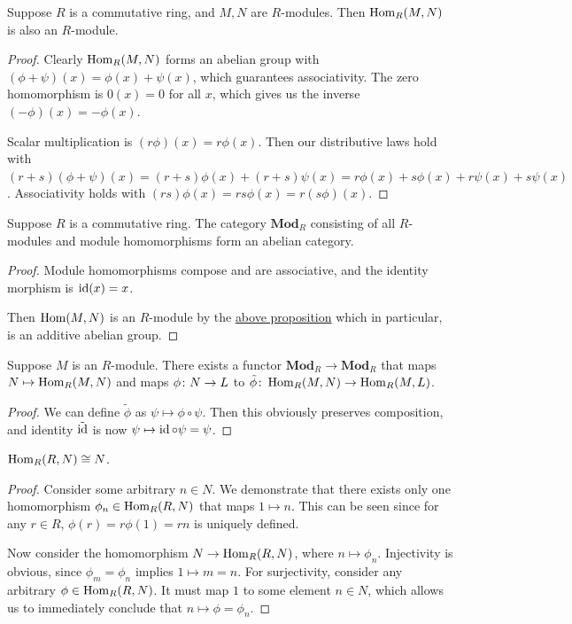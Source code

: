 \begin{proposition}\label{prop:module-hom}
    Suppose \(R\) is a commutative ring, and \(M,N\) are \(R\)-modules.
    Then \(\operatorname{Hom}_R(M,N)\) is also an \(R\)-module.
\end{proposition}
\begin{proof}
    Clearly \(\operatorname{Hom}_R(M,N)\) forms an abelian group with
    \((\phi+\psi)(x) = \phi(x)+\psi(x)\),
    which guarantees associativity.
    The zero homomorphism is \(0(x) = 0\) for all \(x\),
    which gives us the inverse \((-\phi)(x) = -\phi(x)\).

    Scalar multiplication is \((r\phi)(x) = r\phi(x)\).
    Then our distributive laws hold with
    \((r+s)(\phi+\psi)(x) = (r+s)\phi(x) + (r+s)\psi(x) = r\phi(x) + s\phi(x) + r\psi(x) + s\psi(x)\).
    Associativity holds with \((rs)\phi(x) = rs\phi(x) = r(s\phi)(x)\).
\end{proof}
\begin{proposition}\label{prop:module-ab-cat}
    Suppose \(R\) is a commutative ring.
    The category \(\textbf{Mod}_R\) consisting of all \(R\)-modules
    and module homomorphisms form an abelian category.
\end{proposition}
\begin{proof}
    Module homomorphisms compose and are associative,
    and the identity morphism is \(\operatorname{id}(x) = x\).

    Then \(\operatorname{Hom}(M,N)\) is an \(R\)-module by the \hyperref[prop:module-hom]{above proposition}
    which in particular, is an additive abelian group.
\end{proof}
\begin{proposition}\label{prop:module-hom-functor}
    Suppose \(M\) is an \(R\)-module.
    There exists a functor \(\textbf{Mod}_R \to \textbf{Mod}_R\)
    that maps \(N \mapsto \operatorname{Hom}_R(M,N)\)
    and maps \(\phi\colon N\to L\) to \(\tilde{\phi}\colon\operatorname{Hom}_R(M,N)\to\operatorname{Hom}_R(M,L)\).
\end{proposition}
\begin{proof}
    We can define \(\tilde{\phi}\) as \(\psi \mapsto \phi\circ\psi\).
    Then this obviously preserves composition,
    and identity \(\tilde{\operatorname{id}}\) is now \(\psi \mapsto \operatorname{id}\circ\psi = \psi\).
\end{proof}
\begin{proposition}
    \(\operatorname{Hom}_R(R,N) \cong N\).
\end{proposition}
\begin{proof}
    Consider some arbitrary \(n \in N\).
    We demonstrate that there exists only one homomorphism \(\phi_n \in \operatorname{Hom}_R(R,N)\)
    that maps \(1 \mapsto n\).
    This can be seen since for any \(r \in R\),
    \(\phi(r) = r\phi(1) = rn\) is uniquely defined.

    Now consider the homomorphism \(N \to \operatorname{Hom}_R(R,N)\),
    where \(n \mapsto \phi_n\).
    Injectivity is obvious, since \(\phi_m = \phi_n\) implies \(1 \mapsto m = n\).
    For surjectivity, consider any arbitrary \(\phi \in \operatorname{Hom}_R(R,N)\).
    It must map \(1\) to some element \(n \in N\),
    which allows us to immediately conclude that \(n \mapsto \phi = \phi_n\).
\end{proof}

